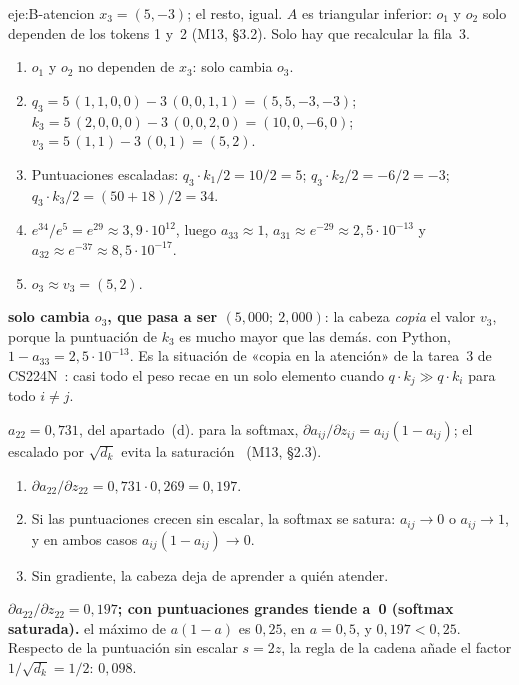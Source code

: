 \begin{solucion}{eje:B-atencion}
\datos $x_3=(5,-3)$; el resto, igual.
\planteamiento $A$ es triangular inferior: $o_1$ y $o_2$ solo dependen de los tokens 1 y~2 (M13, §3.2). Solo hay que recalcular la fila~3.
\pasos
\begin{enumerate}[label=\arabic*.]
  \item $o_1$ y $o_2$ no dependen de $x_3$: solo cambia $o_3$.
  \item $q_3=5\,(1,1,0,0)-3\,(0,0,1,1)=(5,5,-3,-3)$; $k_3=5\,(2,0,0,0)-3\,(0,0,2,0)=(10,0,-6,0)$; $v_3=5\,(1,1)-3\,(0,1)=(5,2)$.
  \item Puntuaciones escaladas: $q_3\cdot k_1/2=10/2=5$; $q_3\cdot k_2/2=-6/2=-3$; $q_3\cdot k_3/2=(50+18)/2=34$.
  \item $e^{34}/e^{5}=e^{29}\approx 3{,}9\cdot 10^{12}$, luego $a_{33}\approx 1$, $a_{31}\approx e^{-29}\approx 2{,}5\cdot 10^{-13}$ y $a_{32}\approx e^{-37}\approx 8{,}5\cdot 10^{-17}$.
  \item $o_3\approx v_3=(5,2)$.
\end{enumerate}
\resultado \textbf{solo cambia $o_3$, que pasa a ser $(5{,}000;\allowbreak\ 2{,}000)$}: la cabeza \emph{copia} el valor $v_3$, porque la puntuación de $k_3$ es mucho mayor que las demás.
\comprobacion con Python, $1-a_{33}=2{,}5\cdot 10^{-13}$. Es la situación de «copia en la atención» de la tarea~3 de CS224N~\cite{cs224n}: casi todo el peso recae en un solo elemento cuando $q\cdot k_j\gg q\cdot k_i$ para todo $i\ne j$.

\datos $a_{22}=0{,}731$, del apartado~(d).
\planteamiento para la softmax, $\partial a_{ij}/\partial z_{ij}=a_{ij}(1-a_{ij})$; el escalado por $\sqrt{d_k}$ evita la saturación~\cite[§3.2.1]{vaswani} (M13, §2.3).
\pasos
\begin{enumerate}[label=\arabic*.]
  \item $\partial a_{22}/\partial z_{22}=0{,}731\cdot 0{,}269=0{,}197$.
  \item Si las puntuaciones crecen sin escalar, la softmax se satura: $a_{ij}\to 0$ o $a_{ij}\to 1$, y en ambos casos $a_{ij}(1-a_{ij})\to 0$.
  \item Sin gradiente, la cabeza deja de aprender a quién atender.
\end{enumerate}
\resultado \textbf{$\partial a_{22}/\partial z_{22}=0{,}197$; con puntuaciones grandes tiende a~0 (softmax saturada).}
\comprobacion el máximo de $a(1-a)$ es $0{,}25$, en $a=0{,}5$, y $0{,}197<0{,}25$. Respecto de la puntuación sin escalar $s=2z$, la regla de la cadena añade el factor $1/\sqrt{d_k}=1/2$: $0{,}098$.

\end{solucion}

